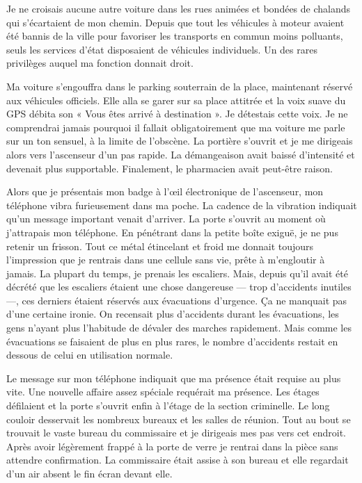 Je ne croisais aucune autre voiture dans les rues animées et bondées de chalands qui s'écartaient de mon chemin. Depuis
que tout les véhicules à moteur avaient été bannis de la ville pour favoriser les transports en commun moins polluants,
seuls les services d'état disposaient de véhicules individuels. Un des rares privilèges auquel ma fonction donnait
droit.

Ma voiture s'engouffra dans le parking souterrain de la place, maintenant réservé aux véhicules officiels. Elle alla se
garer sur sa place attitrée et la voix suave du GPS débita son « Vous êtes arrivé à destination ». Je détestais cette
voix. Je ne comprendrai jamais pourquoi il fallait obligatoirement que ma voiture me parle sur un ton sensuel, à la
limite de l'obscène. La portière s'ouvrit et je me dirigeais alors vers l'ascenseur d'un pas rapide. La démangeaison
avait baissé d'intensité et devenait plus supportable. Finalement, le pharmacien avait peut-être raison.

Alors que je présentais mon badge à l'œil électronique de l'ascenseur, mon téléphone vibra furieusement dans ma poche.
La cadence de la vibration indiquait qu'un message important venait d'arriver. La porte s'ouvrit au moment où
j'attrapais mon téléphone. En pénétrant dans la petite boîte exiguë, je ne pus retenir un frisson. Tout ce métal
étincelant et froid me donnait toujours l'impression que je rentrais dans une cellule sans vie, prête à m'engloutir à
jamais. La plupart du temps, je prenais les escaliers. Mais, depuis qu'il avait été décrété que les escaliers étaient
une chose dangereuse — trop d'accidents inutiles —, ces derniers étaient réservés aux évacuations d'urgence. Ça ne
manquait pas d'une certaine ironie. On recensait plus d'accidents durant les évacuations, les gens n'ayant plus
l'habitude de dévaler des marches rapidement. Mais comme les évacuations se faisaient de plus en plus rares, le nombre
d'accidents restait en dessous de celui en utilisation normale.

Le message sur mon téléphone indiquait que ma présence était requise au plus vite. Une nouvelle affaire assez spéciale
requérait ma présence. Les étages défilaient et la porte s'ouvrit enfin à l'étage de la section criminelle. Le long
couloir desservait les nombreux bureaux et les salles de réunion. Tout au bout se trouvait le vaste bureau du
commissaire et je dirigeais mes pas vers cet endroit. Après avoir légèrement frappé à la porte de verre je rentrai dans
la pièce sans attendre confirmation. La commissaire était assise à son bureau et elle regardait d'un air absent le fin
écran devant elle.

